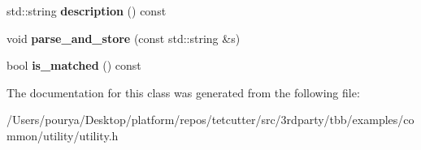 \begin{DoxyCompactItemize}
\item 
\hypertarget{classutility_1_1internal_1_1argument_a730ff603a064376b28644b2315955d2b}{}std\+::string {\bfseries description} () const \label{classutility_1_1internal_1_1argument_a730ff603a064376b28644b2315955d2b}

\item 
\hypertarget{classutility_1_1internal_1_1argument_adb0075ddfc3a518aca921cea60614315}{}void {\bfseries parse\+\_\+and\+\_\+store} (const std\+::string \&s)\label{classutility_1_1internal_1_1argument_adb0075ddfc3a518aca921cea60614315}

\item 
\hypertarget{classutility_1_1internal_1_1argument_a88e3adc89ac5c5477be6e467c8702b54}{}bool {\bfseries is\+\_\+matched} () const \label{classutility_1_1internal_1_1argument_a88e3adc89ac5c5477be6e467c8702b54}

\end{DoxyCompactItemize}


The documentation for this class was generated from the following file\+:\begin{DoxyCompactItemize}
\item 
/\+Users/pourya/\+Desktop/platform/repos/tetcutter/src/3rdparty/tbb/examples/common/utility/utility.\+h\end{DoxyCompactItemize}

